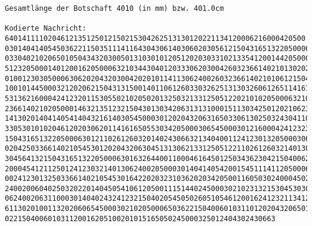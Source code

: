 \documentclass[a4paper,10pt,ngerman]{scrartcl}
\begin{document}
\begin{enumerate}
\begin{verbatim}
Gesamtlänge der Botschaft 4010 (in mm) bzw. 401.0cm

Kodierte Nachricht: 6401411110204612135125012150215304262513130120221134120006216000420500
030140414054503622115035111411643043061403060203056121504316513220500063012160004241232623
033040210206501050434320300501310301012051202030331021335412001442050003014040250340163213
512320500014012001620500063210344304012033306203004260323661402101302020306241232016111600
010012303050006306202043203004202010114113062400260323661402101061215040060026010363265020
100101445000321202062150431315001401106126033032625131303260612651141616110203250326466546
531362160004241232011530550210205020132503213312505122021010205000632103443040120204320016
236614021020500014632135123215043013034206313131000151130342501202106236004025056321345040
141302014041405414043216140305450003012020432063165033061302503243041101200162133125051220
330530101020461202030620114161650553034205000306545000301216000424123231325014303053200162
150431651322050006301211026126032014024306632134040011241230132050003065450003011302105033
020425033661402105453012020432063045131306213312505122110261260321401306240020512020402054
304564132150431651322050006301632644001100046164501250343623042150400620402111150362202106
200045412112501241230321401306240020500030140414054200154511141120500063012011460652305424
002412301325033661402105453016422020323103620203420500116050302400045021020215150400020512
240020060402503202201404505410612050011151440245000302102313215304530305325012150430130343
062400206311000301404024324123215040205450502605105461200162412321134120006632134503021010
611302010011320206065450003021020500065036221504006010311012020432065010514010130620203062
022150400601031120016205100201015165050245000325012404302430663
\end{verbatim}


\end{enumerate}
\end{document}
